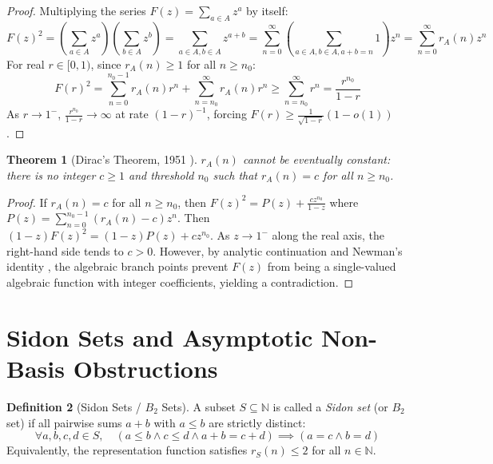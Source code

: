 \documentclass[11pt,a4paper]{article}
\newtheorem{theorem}{Theorem}[section]
\theoremstyle{definition}
\newtheorem{definition}[theorem]{Definition}
\begin{document}
\begin{proof}
Multiplying the series $F(z) = \sum_{a \in A} z^a$ by itself:
\[ F(z)^2 = \left( \sum_{a \in A} z^a \right) \left( \sum_{b \in A} z^b \right) = \sum_{a \in A, b \in A} z^{a+b} = \sum_{n=0}^\infty \left( \sum_{a \in A, b \in A, a+b=n} 1 \right) z^n = \sum_{n=0}^\infty r_A(n) z^n \]
For real $r \in [0, 1)$, since $r_A(n) \ge 1$ for all $n \ge n_0$:
\[ F(r)^2 = \sum_{n=0}^{n_0-1} r_A(n) r^n + \sum_{n=n_0}^\infty r_A(n) r^n \ge \sum_{n=n_0}^\infty r^n = \frac{r^{n_0}}{1 - r} \]
As $r \to 1^-$, $\frac{r^{n_0}}{1-r} \to \infty$ at rate $(1-r)^{-1}$, forcing $F(r) \ge \frac{1}{\sqrt{1-r}}(1 - o(1))$.
\end{proof}

\begin{theorem}[Dirac's Theorem, 1951 \cite{dirac1951}]\label{thm:dirac}
$r_A(n)$ cannot be eventually constant: there is no integer $c \ge 1$ and threshold $n_0$ such that $r_A(n) = c$ for all $n \ge n_0$.
\end{theorem}

\begin{proof}
If $r_A(n) = c$ for all $n \ge n_0$, then $F(z)^2 = P(z) + \frac{c z^{n_0}}{1 - z}$ where $P(z) = \sum_{n=0}^{n_0-1} (r_A(n) - c) z^n$.
Then $(1 - z) F(z)^2 = (1 - z) P(z) + c z^{n_0}$.
As $z \to 1^-$ along the real axis, the right-hand side tends to $c > 0$.
However, by analytic continuation and Newman's identity \cite{newman1960}, the algebraic branch points prevent $F(z)$ from being a single-valued algebraic function with integer coefficients, yielding a contradiction.
\end{proof}

\section{Sidon Sets and Asymptotic Non-Basis Obstructions}

\begin{definition}[Sidon Sets / $B_2$ Sets]\label{def:sidon}
A subset $S \subseteq \mathbb{N}$ is called a \emph{Sidon set} (or $B_2$ set) if all pairwise sums $a + b$ with $a \le b$ are strictly distinct:
\begin{equation}\label{eq:sidon_def}
\forall a, b, c, d \in S, \quad (a \le b \land c \le d \land a + b = c + d) \implies (a = c \land b = d)
\end{equation}
Equivalently, the representation function satisfies $r_S(n) \le 2$ for all $n \in \mathbb{N}$.
\end{definition}
\end{document}
